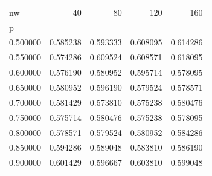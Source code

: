 \begin{tabular}{lrrrr}
\toprule
nw & 40 & 80 & 120 & 160 \\
p &  &  &  &  \\
\midrule
0.500000 & 0.585238 & 0.593333 & 0.608095 & 0.614286 \\
0.550000 & 0.574286 & 0.609524 & 0.608571 & 0.618095 \\
0.600000 & 0.576190 & 0.580952 & 0.595714 & 0.578095 \\
0.650000 & 0.580952 & 0.596190 & 0.579524 & 0.578571 \\
0.700000 & 0.581429 & 0.573810 & 0.575238 & 0.580476 \\
0.750000 & 0.575714 & 0.580476 & 0.575238 & 0.578095 \\
0.800000 & 0.578571 & 0.579524 & 0.580952 & 0.584286 \\
0.850000 & 0.594286 & 0.589048 & 0.583810 & 0.586190 \\
0.900000 & 0.601429 & 0.596667 & 0.603810 & 0.599048 \\
\bottomrule
\end{tabular}
